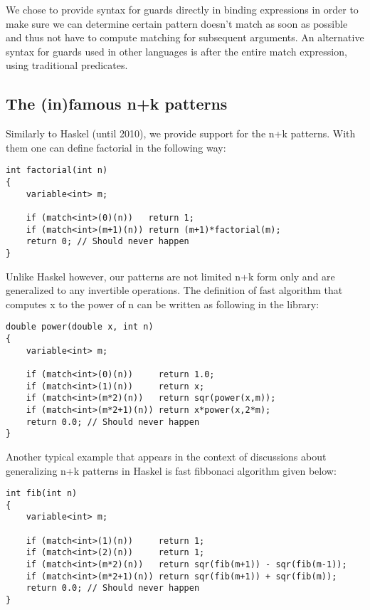\documentclass[submission,copyright]{eptcs}
\begin{document}
We chose to provide syntax for guards directly in binding expressions in order 
to make sure we can determine certain pattern doesn't match as soon as possible 
and thus not have to compute matching for subsequent arguments. An alternative 
syntax for guards used in other languages is after the entire match expression, 
using traditional predicates.

\subsection{The (in)famous n+k patterns}

Similarly to Haskel (until 2010), we provide support for the n+k patterns. With 
them one can define factorial in the following way:

\begin{lstlisting}
int factorial(int n)
{
    variable<int> m;

    if (match<int>(0)(n))   return 1;
    if (match<int>(m+1)(n)) return (m+1)*factorial(m);
    return 0; // Should never happen
}
\end{lstlisting}

Unlike Haskel however, our patterns are not limited n+k form only and are 
generalized to any invertible operations. The definition of fast algorithm that 
computes x to the power of n can be written as following in the library:

\begin{lstlisting}
double power(double x, int n)
{
    variable<int> m;

    if (match<int>(0)(n))     return 1.0;
    if (match<int>(1)(n))     return x;
    if (match<int>(m*2)(n))   return sqr(power(x,m));
    if (match<int>(m*2+1)(n)) return x*power(x,2*m);
    return 0.0; // Should never happen
}
\end{lstlisting}

Another typical example that appears in the context of discussions about 
generalizing n+k patterns in Haskel is fast fibbonaci algorithm given below:

\begin{lstlisting}
int fib(int n)
{
    variable<int> m;

    if (match<int>(1)(n))     return 1;
    if (match<int>(2)(n))     return 1;
    if (match<int>(m*2)(n))   return sqr(fib(m+1)) - sqr(fib(m-1));
    if (match<int>(m*2+1)(n)) return sqr(fib(m+1)) + sqr(fib(m));
    return 0.0; // Should never happen
}
\end{lstlisting}
\end{document}
